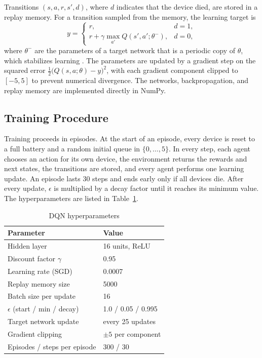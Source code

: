 \documentclass[conference]{IEEEtran}
\begin{document}
Transitions $(s,a,r,s',d)$, where $d$ indicates that the device died, are stored in a replay memory. For a transition sampled from the memory, the learning target is
\begin{equation}
y =
\begin{cases}
r, & d=1,\\
r + \gamma \max_{a'} Q(s',a';\theta^{-}), & d=0,
\end{cases}
\end{equation}
where $\theta^{-}$ are the parameters of a target network that is a periodic copy of $\theta$, which stabilizes learning \cite{mnih2015}. The parameters are updated by a gradient step on the squared error $\tfrac{1}{2}\bigl(Q(s,a;\theta)-y\bigr)^2$, with each gradient component clipped to $[-5,5]$ to prevent numerical divergence. The networks, backpropagation, and replay memory are implemented directly in NumPy.

\subsection{Training Procedure}
Training proceeds in episodes. At the start of an episode, every device is reset to a full battery and a random initial queue in $\{0,\dots,5\}$. In every step, each agent chooses an action for its own device, the environment returns the rewards and next states, the transitions are stored, and every agent performs one learning update. An episode lasts 30 steps and ends early only if all devices die. After every update, $\epsilon$ is multiplied by a decay factor until it reaches its minimum value. The hyperparameters are listed in Table~\ref{tab:hyper}.

\begin{table}[t]
\caption{DQN hyperparameters}
\label{tab:hyper}
\centering
\small
\begin{tabular}{@{}ll@{}}
\toprule
Parameter & Value \\
\midrule
Hidden layer & 16 units, ReLU \\
Discount factor $\gamma$ & 0.95 \\
Learning rate (SGD) & 0.0007 \\
Replay memory size & 5000 \\
Batch size per update & 16 \\
$\epsilon$ (start / min / decay) & 1.0 / 0.05 / 0.995 \\
Target network update & every 25 updates \\
Gradient clipping & $\pm 5$ per component \\
Episodes / steps per episode & 300 / 30 \\
\bottomrule
\end{tabular}
\end{table}
\end{document}
